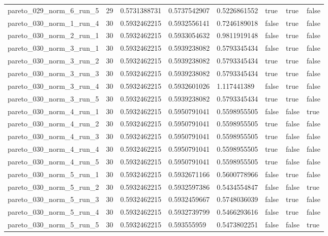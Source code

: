 \begin{tabular}{@{}llllllll@{}}
pareto\_029\_norm\_6\_run\_5 & 29 & 0.5731388731 & 0.5737542907 & 0.5226861552 & true & true & false \\
pareto\_030\_norm\_1\_run\_4 & 30 & 0.5932462215 & 0.5932556141 & 0.7246189018 & false & true & false \\
pareto\_030\_norm\_2\_run\_1 & 30 & 0.5932462215 & 0.5933054632 & 0.9811919148 & false & true & false \\
pareto\_030\_norm\_3\_run\_1 & 30 & 0.5932462215 & 0.5939238082 & 0.5793345434 & false & true & false \\
pareto\_030\_norm\_3\_run\_2 & 30 & 0.5932462215 & 0.5939238082 & 0.5793345434 & true & true & false \\
pareto\_030\_norm\_3\_run\_3 & 30 & 0.5932462215 & 0.5939238082 & 0.5793345434 & true & true & false \\
pareto\_030\_norm\_3\_run\_4 & 30 & 0.5932462215 & 0.5932601026 & 1.117441389 & false & true & false \\
pareto\_030\_norm\_3\_run\_5 & 30 & 0.5932462215 & 0.5939238082 & 0.5793345434 & true & true & false \\
pareto\_030\_norm\_4\_run\_1 & 30 & 0.5932462215 & 0.5950791041 & 0.5598955505 & false & false & true \\
pareto\_030\_norm\_4\_run\_2 & 30 & 0.5932462215 & 0.5950791041 & 0.5598955505 & true & false & false \\
pareto\_030\_norm\_4\_run\_3 & 30 & 0.5932462215 & 0.5950791041 & 0.5598955505 & true & false & false \\
pareto\_030\_norm\_4\_run\_4 & 30 & 0.5932462215 & 0.5950791041 & 0.5598955505 & true & false & false \\
pareto\_030\_norm\_4\_run\_5 & 30 & 0.5932462215 & 0.5950791041 & 0.5598955505 & true & false & false \\
pareto\_030\_norm\_5\_run\_1 & 30 & 0.5932462215 & 0.5932671166 & 0.5600778966 & false & true & false \\
pareto\_030\_norm\_5\_run\_2 & 30 & 0.5932462215 & 0.5932597386 & 0.5434554847 & false & false & true \\
pareto\_030\_norm\_5\_run\_3 & 30 & 0.5932462215 & 0.5932459667 & 0.5748036039 & false & true & false \\
pareto\_030\_norm\_5\_run\_4 & 30 & 0.5932462215 & 0.5932739799 & 0.5466293616 & false & true & false \\
pareto\_030\_norm\_5\_run\_5 & 30 & 0.5932462215 & 0.593555959 & 0.5473802251 & false & false & true \\

\end{tabular}
